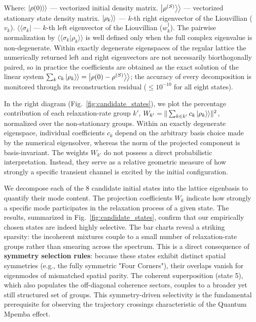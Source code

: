 \documentclass[pdflatex,sn-mathphys-num]{sn-jnl}
\renewcommand{\textcolor}[2]{#2}
\newcommand{\ketket}[1]{\left| #1 \right\rangle \! \mathclose{\left. \vphantom{#1} \right\rangle}}
\begin{document}
Where: $ \ketket{\rho(0)}$ --- vectorized initial density matrix. $\ketket{\rho^{(S)}}$ --- vectorized stationary state density matrix. $\ketket{\rho_k}$ --- $k$-th right eigenvector of the Liouvillian ($v_k$). $\langle\langle\sigma_k | $ --- $k$-th left eigenvector of the Liouvillian ($w_k^\dagger$).\textcolor{green}{ The pairwise normalization by $\langle\langle\sigma_k | \rho_k\rangle\rangle$ is well defined only when the full complex eigenvalue is non-degenerate. Within exactly degenerate eigenspaces of the regular lattice the numerically returned left and right eigenvectors are not necessarily biorthogonally paired, so in practice the coefficients are obtained as the exact solution of the linear system $\sum_k c_k \ketket{\rho_k} = \ketket{\rho(0) - \rho^{(S)}}$; the accuracy of every decomposition is monitored through its reconstruction residual ($\leq 10^{-10}$ for all eight states).}

In the right diagram (Fig.~\ref{fig:candidate_states}), we plot the percentage contribution of each relaxation-rate group $k'$, $W_{k'} = \|\sum_{k \in k'} c_k \ketket{\rho_k}\|^2$, normalized over the non-stationary groups. Within an exactly degenerate eigenspace, individual coefficients $c_k$ depend on the arbitrary basis choice made by the numerical eigensolver, whereas the norm of the projected component is basis-invariant. {The weights $W_{k'}$ do not possess a direct probabilistic interpretation. Instead, they serve as a relative geometric measure of how strongly a specific transient channel is excited by the initial configuration.}



We decompose each of the 8 candidate initial states into the lattice eigenbasis to quantify their mode content. The projection coefficients $W_k$ indicate how strongly a specific mode participates in the relaxation process of a given state. The results, summarized in Fig.~\ref{fig:candidate_states}, confirm that our empirically chosen states are indeed highly selective. \textcolor{green}{The bar charts reveal a striking sparsity: the incoherent mixtures couple to a small number of relaxation-rate groups rather than smearing across the spectrum. This is a direct consequence of \textbf{symmetry selection rules}: because these states exhibit distinct spatial symmetries (e.g., the fully symmetric "Four Corners"), their overlaps vanish for eigenmodes of mismatched spatial parity. The coherent superposition (state 5), which also populates the off-diagonal coherence sectors, couples to a broader yet still structured set of groups.} This symmetry-driven selectivity is the fundamental prerequisite for observing the trajectory crossings characteristic of the Quantum Mpemba effect.
\end{document}
